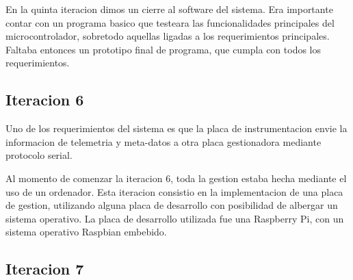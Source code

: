 En la quinta iteracion dimos un cierre al software del sistema. Era importante contar con un programa basico que testeara las funcionalidades principales del microcontrolador, sobretodo aquellas ligadas a los requerimientos principales. Faltaba entonces un prototipo final de programa, que cumpla con todos los requerimientos. 


\subsection{Iteracion 6} %
\label{sub:iteracion_6}

Uno de los requerimientos del sistema es que la placa de instrumentacion envie la informacion de telemetria y meta-datos a otra placa gestionadora mediante protocolo serial. 

Al momento de comenzar la iteracion 6, toda la gestion estaba hecha mediante el uso de un ordenador. Esta iteracion consistio en la implementacion de una placa de gestion, utilizando alguna placa de desarrollo con posibilidad de albergar un sistema operativo. 
La placa de desarrollo utilizada fue una Raspberry Pi, con un sistema operativo Raspbian embebido. 


\subsection{Iteracion 7} %
\label{sub:iteracion_7}

